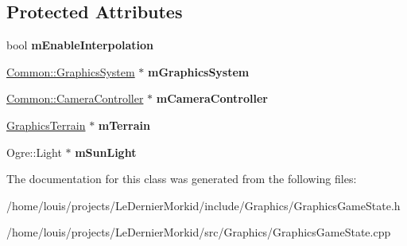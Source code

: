 \subsection*{Protected Attributes}
\begin{DoxyCompactItemize}
\item 
\mbox{\label{class_graphics_game_state_ad6d8656a6af5861d756f8e677a06567d}} 
bool {\bfseries m\+Enable\+Interpolation}
\item 
\mbox{\label{class_graphics_game_state_a6931ab79c90541e4e3cc93cd79a733f6}} 
\hyperlink{class_common_1_1_graphics_system}{Common\+::\+Graphics\+System} $\ast$ {\bfseries m\+Graphics\+System}
\item 
\mbox{\label{class_graphics_game_state_a2debaa701782161be4b2376872a9194c}} 
\hyperlink{class_common_1_1_camera_controller}{Common\+::\+Camera\+Controller} $\ast$ {\bfseries m\+Camera\+Controller}
\item 
\mbox{\label{class_graphics_game_state_a9f260815846c0fc225ff59a2dda90b27}} 
\hyperlink{class_graphics_terrain}{Graphics\+Terrain} $\ast$ {\bfseries m\+Terrain}
\item 
\mbox{\label{class_graphics_game_state_a59e90f7396f9ae5db563c3be4ac89139}} 
Ogre\+::\+Light $\ast$ {\bfseries m\+Sun\+Light}
\end{DoxyCompactItemize}


The documentation for this class was generated from the following files\+:\begin{DoxyCompactItemize}
\item 
/home/louis/projects/\+Le\+Dernier\+Morkid/include/\+Graphics/Graphics\+Game\+State.\+h\item 
/home/louis/projects/\+Le\+Dernier\+Morkid/src/\+Graphics/Graphics\+Game\+State.\+cpp\end{DoxyCompactItemize}
